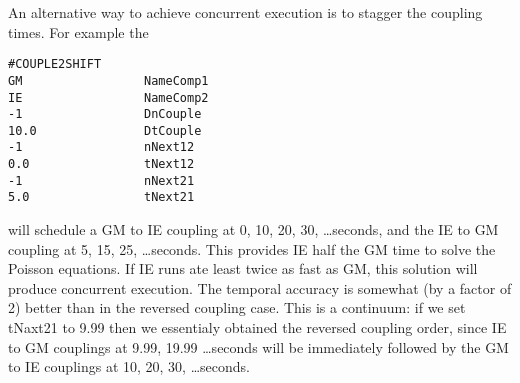 An alternative way to achieve concurrent execution is to
stagger the coupling times. For example the
\begin{verbatim}
#COUPLE2SHIFT
GM                 NameComp1
IE                 NameComp2
-1                 DnCouple
10.0               DtCouple
-1                 nNext12
0.0                tNext12
-1                 nNext21
5.0                tNext21
\end{verbatim}
will schedule a GM to IE coupling at 0, 10, 20, 30, \ldots seconds,
and the IE to GM coupling at 5, 15, 25, \ldots seconds.
This provides IE half the GM time to solve the Poisson equations.
If IE runs ate least twice as fast as GM, this solution will
produce concurrent execution. The temporal accuracy is
somewhat (by a factor of 2) better than in the reversed coupling case.
This is a continuum: if we set tNaxt21 to 9.99 then we essentialy
obtained the reversed coupling order, since IE to GM couplings
at 9.99, 19.99 \ldots seconds will be immediately followed
by the GM to IE couplings at 10, 20, 30, \ldots seconds.
